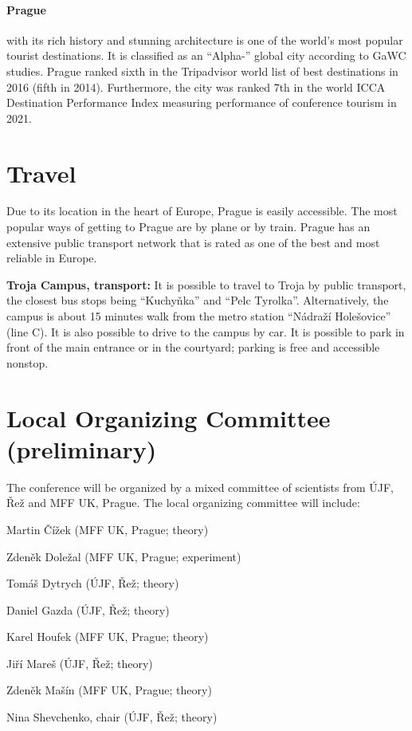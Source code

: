 \documentclass[12pt]{extarticle}
\newcommand{\dg}[1]{\todo[inline]{DG: #1}}
\newcommand*\sq{\mathbin{\vcenter{\hbox{\rule{.8ex}{.8ex}}}}}
\newenvironment{t_sq_itemize}
{\begin{itemize}[topsep=0pt, parsep=0pt, itemsep=0pt, leftmargin=*]
    \renewcommand{\labelitemi}{{\(\sq\)}}}
  {\end{itemize}}
\begin{document}
\paragraph{Prague} with its rich history and stunning architecture is one of the
world's most popular tourist destinations. It is classified as an
``Alpha-{}'' global city according to GaWC studies. Prague ranked sixth
in the Tripadvisor world list of best destinations in 2016 (fifth in
2014). Furthermore, the city was ranked 7th in the world ICCA
Destination Performance Index measuring performance of conference
tourism in 2021.


\section*{Travel}
\noindent
%
Due to its location in the heart of Europe, Prague is easily
accessible. The most popular ways of getting to Prague are by plane or
by train. Prague has an extensive public transport network that is
rated as one of the best and most reliable in Europe.

{\bf Troja Campus, transport:} It is possible to travel to Troja by public transport, the closest bus stops being “Kuchyňka”
and “Pelc Tyrolka”. Alternatively, the campus is about 15 minutes walk from the metro station “Nádraží Holešovice”
(line C). It is also possible to drive to the campus by car. It is possible to park in front of the main entrance or in the courtyard;
parking is free and accessible nonstop.


\section*{Local Organizing Committee (preliminary)}
\noindent
%
The conference will be organized by a mixed committee of scientists from ÚJF, Řež and MFF UK, Prague.
The local organizing committee will include:
\begin{t_sq_itemize}
\item Martin Čížek (MFF UK, Prague; theory)
\item Zdeněk Doležal (MFF UK, Prague; experiment)
\item Tomáš Dytrych (ÚJF, Řež; theory)
\item Daniel Gazda (ÚJF, Řež; theory)
\item Karel Houfek (MFF UK, Prague; theory)
\item Jiří Mareš (ÚJF, Řež; theory)
\item Zdeněk Mašín (MFF UK, Prague; theory)
\item Nina Shevchenko, chair (ÚJF, Řež; theory)
\end{t_sq_itemize}
\dg{Exp.\ UOCHB, JH?}
\end{document}

